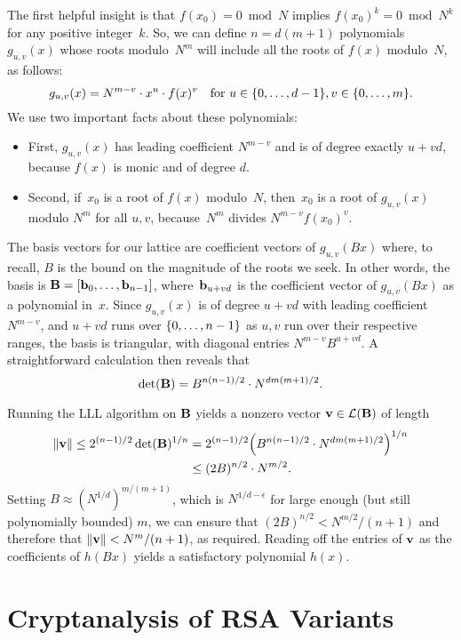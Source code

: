 \documentclass[11pt]{article}
\begin{document}
The first helpful insight is that $f(x_{0}) = 0 \bmod N$ implies
$f(x_{0})^{k} = 0 \bmod N^{k}$ for any positive integer~$k$. So, we
can define $n=d(m+1)$ polynomials $g_{u,v}(x)$ whose roots
modulo~$N^{m}$ will include all the roots of $f(x)$ modulo~$N$, as
follows:
\[ g_{u,v}(x)=N^{m-v} \cdot x^{u} \cdot f(x)^{v} \quad \text{for } u
  \in \{0,\ldots,d-1\}, v \in \{0,\ldots,m\}. \] We use two
important facts about these polynomials:
\begin{itemize}
\item First, $g_{u,v}(x)$ has leading coefficient $N^{m-v}$ and is of
  degree exactly $u+vd$, because $f(x)$ is monic and of degree $d$.
\item Second, if~$x_{0}$ is a root of $f(x)$
  modulo~$N$, then~$x_{0}$ is a root of $g_{u,v}(x)$ modulo $N^{m}$ for
  all $u,v$, because~$N^{m}$ divides $N^{m-v} f(x_{0})^{v}$.
\end{itemize}
 
The basis vectors for our lattice are coefficient vectors of
$g_{u,v}(Bx)$ where, to recall, $B$ is the bound on the magnitude of
the roots we seek. In other words, the basis is
$\mathbf{B}=[\mathbf{b}_0,\ldots,\mathbf{b}_{n-1}]$, where~$\mathbf{b}_{u+vd}$ is the
coefficient vector of $g_{u,v}(Bx)$ as a polynomial in~$x$. Since
$g_{u,v}(x)$ is of degree $u+vd$ with leading coefficient $N^{m-v}$,
and $u+vd$ runs over $\{0, \ldots, n-1\}$ as $u,v$ run over their
respective ranges, the basis is triangular, with diagonal entries
$N^{m-v} B^{u+vd}$. A straightforward calculation then reveals that
\begin{equation}
  \label{eq:det-B}
  \det(\mathbf{B}) = B^{n(n-1)/2} \cdot N^{d m (m+1)/2}.
\end{equation}

Running the LLL algorithm on $\mathbf{B}$ yields a nonzero vector
$\mathbf{v} \in \mathcal{L}(\mathbf{B})$ of length
\begin{align}
  \length{\vecv} \leq 2^{(n-1)/2} \det(\matB)^{1/n}
  &= 2^{(n-1)/2} \parens*{B^{n(n-1)/2} \cdot N^{d m(m+1)/2}}^{1/n} \\
  &\leq (2 B)^{n/2} \cdot N^{m/2}.
\end{align}
Setting $B \approx (N^{1/d})^{m/(m+1)}$, which is $N^{1/d-\epsilon}$
for large enough (but still polynomially bounded) $m$, we can ensure
that $(2B)^{n/2} < N^{m/2}/(n+1)$ and therefore that
$\lVert\mathbf{v}\rVert < N^{m}/(n+1)$, as required. Reading off the entries
of $\mathbf{v}$ as the coefficients of $h(Bx)$ yields a satisfactory
polynomial $h(x)$.

\section{Cryptanalysis of RSA Variants}
\label{sec:crypt-rsa}
\end{document}
